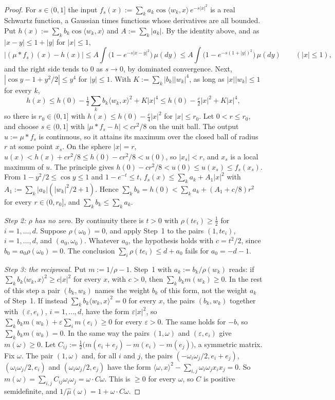 \begin{proof}
For $s \in (0, 1]$ the input $f_s(x) := \sum_ka_k\cos\langle w_k, x\rangle\,e^{-s|x|^2}$ is a real
Schwartz function, a Gaussian times functions whose derivatives are all bounded. Put
$h(x) := \sum_kb_k\cos\langle w_k, x\rangle$ and $A := \sum_k|a_k|$. By the identity above, and as
$|x - y| \le 1 + |y|$ for $|x| \le 1$,
\[
  \bigl|(\mu * f_s)(x) - h(x)\bigr| \le A\int\bigl(1 - e^{-s|x - y|^2}\bigr)\,\mu(dy)
  \le A\int\bigl(1 - e^{-s(1 + |y|)^2}\bigr)\,\mu(dy) \qquad (|x| \le 1),
\]
and the right side tends to $0$ as $s \to 0$, by dominated convergence. Next, $|\cos y - 1 +
y^2/2| \le y^4$ for $|y| \le 1$. With $K := \sum_k|b_k||w_k|^4$, as long as $|x||w_k| \le 1$ for
every $k$,
\[
  h(x) \le h(0) - \tfrac12\sum_kb_k\langle w_k, x\rangle^2 + K|x|^4
  \le h(0) - \tfrac c2|x|^2 + K|x|^4 ,
\]
so there is $r_0 \in (0, 1]$ with $h(x) \le h(0) - \frac c4|x|^2$ for $|x| \le r_0$. Let
$0 < r \le r_0$, and choose $s \in (0, 1]$ with $|\mu * f_s - h| < cr^2/8$ on the unit ball. The output
$u := \mu * f_s$ is continuous, so it attains its maximum over the closed ball of radius $r$ at some
point $x_s$. On the sphere $|x| = r$, $u(x) < h(x) + cr^2/8 \le h(0) - cr^2/8 < u(0)$, so
$|x_s| < r$, and $x_s$ is a local maximum of $u$. The principle gives
$h(0) - cr^2/8 < u(0) \le u(x_s) \le f_s(x_s)$. From $1 - y^2/2 \le \cos y \le 1$ and
$1 - e^{-t} \le t$, $f_s(x) \le \sum_ka_k + A_1|x|^2$ with $A_1 := \sum_k|a_k|(|w_k|^2/2 + 1)$.
Hence $\sum_kb_k = h(0) < \sum_ka_k + (A_1 + c/8)r^2$ for every $r \in (0, r_0]$, and
$\sum_kb_k \le \sum_ka_k$.

\emph{Step 2: $\rho$ has no zero.} By continuity there is $t > 0$ with $\rho(te_i) \ge \frac12$ for
$i = 1, \dots, d$. Suppose $\rho(\omega_0) = 0$, and apply Step~1 to the pairs $(1, te_i)$,
$i = 1, \dots, d$, and $(a_0, \omega_0)$. Whatever $a_0$, the hypothesis holds with $c = t^2/2$,
since $b_0 = a_0\rho(\omega_0) = 0$. The conclusion $\sum_i\rho(te_i) \le d + a_0$ fails for
$a_0 = -d - 1$.

\emph{Step 3: the reciprocal.} Put $m := 1/\rho - 1$. Step~1 with $a_k := b_k/\rho(w_k)$ reads: if
$\sum_kb_k\langle w_k, x\rangle^2 \ge c|x|^2$ for every $x$, with $c > 0$, then
$\sum_kb_km(w_k) \ge 0$. In the rest of this step a pair $(b_k, w_k)$ names the weight $b_k$ of this
form, not the weight $a_k$ of Step~1. If instead $\sum_kb_k\langle w_k, x\rangle^2 = 0$ for every $x$, the pairs
$(b_k, w_k)$ together with $(\varepsilon, e_i)$, $i = 1, \dots, d$, have the form $\varepsilon|x|^2$,
so $\sum_kb_km(w_k) + \varepsilon\sum_im(e_i) \ge 0$ for every $\varepsilon > 0$. The same holds
for $-b$, so $\sum_kb_km(w_k) = 0$. In the same way the pairs $(1, \omega)$ and
$(\varepsilon, e_i)$ give $m(\omega) \ge 0$. Let $C_{ij} := \frac12\bigl(m(e_i + e_j) - m(e_i) -
m(e_j)\bigr)$, a symmetric matrix. Fix $\omega$. The pair $(1, \omega)$ and, for all $i$ and $j$,
the pairs $(-\omega_i\omega_j/2, e_i + e_j)$, $(\omega_i\omega_j/2, e_i)$ and
$(\omega_i\omega_j/2, e_j)$ have the form $\langle\omega, x\rangle^2 -
\sum_{i,j}\omega_i\omega_jx_ix_j = 0$. So
$m(\omega) = \sum_{i,j}C_{ij}\omega_i\omega_j = \omega\cdot C\omega$. This is $\ge 0$ for every
$\omega$, so $C$ is positive semidefinite, and $1/\widehat\mu(\omega) = 1 + \omega\cdot C\omega$.


\end{proof}

